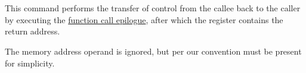 \vspace{-0.35cm}
\paragraph{}\

This command performs the transfer of control from the callee back to the caller
by executing the \hyperlink{functions:return}{function call epilogue},
after which the  register contains the return address.

The memory address operand is ignored, but per our convention must be present
for simplicity.
